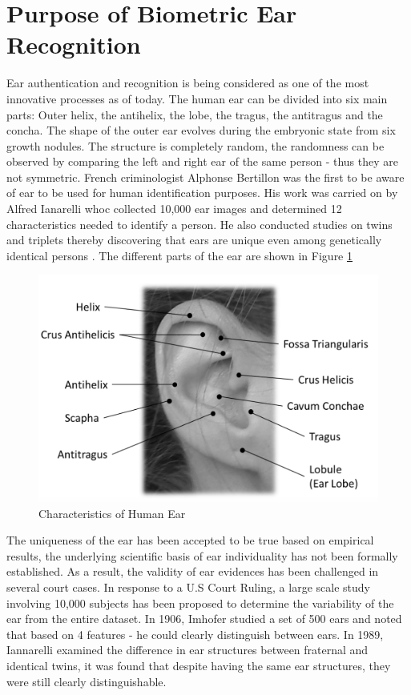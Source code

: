 \section{Purpose of Biometric Ear Recognition} 

Ear authentication and recognition is being considered as one of the most innovative processes as of today. The human ear can be divided into six main parts: Outer helix,
the antihelix, the lobe, the tragus, the antitragus and the concha. The shape of the outer ear evolves during the embryonic state from six growth nodules. The structure is completely random, the randomness can be observed by comparing the left and right ear of the same person - thus they are not symmetric. French criminologist Alphonse Bertillon was the first to be aware of ear to be used for human identification purposes. His work was carried on by Alfred Ianarelli whoc collected 10,000 ear images and determined 12 characteristics needed to identify a person. He also conducted studies on twins and triplets thereby discovering that ears are unique even among genetically identical persons \cite{pflug2012ear}. The different parts of the ear are shown in Figure \ref{fig:Figure2}

\begin{figure}[t]
	\includegraphics[width=\textwidth]{Figures/Figure2}
	\caption{Characteristics of Human Ear\cite{pflug2012ear}} 
	\label{fig:Figure2}
\end{figure}

The uniqueness of the ear has been accepted to be true based on empirical results, the underlying scientific basis of ear individuality has not been formally established. As a result, the validity of ear evidences has been challenged in several court cases. In response to a U.S Court Ruling, a large scale study involving 10,000 subjects has been proposed to determine the variability of the ear from the entire dataset. In 1906, Imhofer studied a set of 500 ears and noted that based on 4 features - he could clearly distinguish between ears. In 1989, Iannarelli examined the difference in ear structures between fraternal and identical twins, it was found that despite having the same ear structures, they were still clearly distinguishable.

